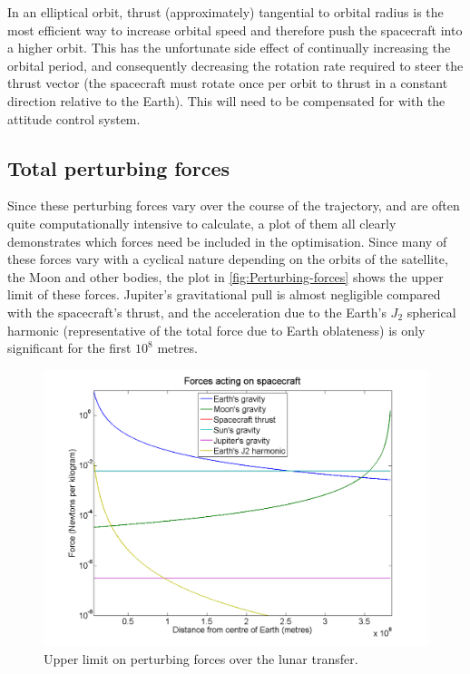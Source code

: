 In an elliptical orbit, thrust (approximately) tangential to orbital radius is the most efficient way to increase orbital speed and therefore push the spacecraft into a higher orbit. This has the unfortunate side effect of continually increasing the orbital period, and consequently decreasing the rotation rate required to steer the thrust vector (the spacecraft must rotate once per orbit to thrust in a constant direction relative to the Earth). This will need to be compensated for with the attitude control system.

\subsection{Total perturbing forces}

Since these perturbing forces vary over the course of the trajectory, and are often quite computationally intensive to calculate, a plot of them all clearly demonstrates which forces need be included in the optimisation. Since many of these forces vary with a cyclical nature depending on the orbits of the satellite, the Moon and other bodies, the plot in \autoref{fig:Perturbing-forces} shows the upper limit of these forces. Jupiter's gravitational pull is almost negligible compared with the spacecraft's thrust, and the acceleration due to the Earth's $J_{2}$ spherical harmonic (representative of the total force due to Earth oblateness) is only significant for the first $10^{8}$ metres.

\begin{figure}[h]
\caption{Upper limit on perturbing forces over the lunar transfer.}
\label{fig:Perturbing-forces}
\centering
\includegraphics[scale=0.4]{Images/relative_forces.png}
\end{figure}

